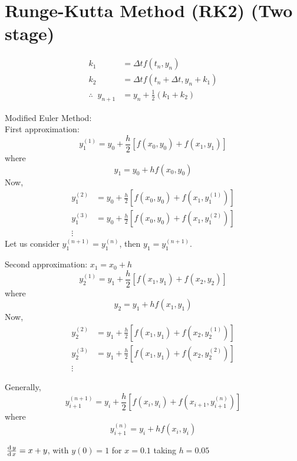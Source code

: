\documentclass[../main-sheet.tex]{subfiles}
\begin{document}
\section{Runge-Kutta Method (RK2) (Two stage)}
\begin{align*}
    k_1&=\Delta t f(t_n,y_n)\\
    k_2&=\Delta t f(t_n+\Delta t,y_n+k_1)\\
    \therefore\;\;y_{n+1}&=y_n+\frac{1}{2}(k_1+k_2)
\end{align*}
\begin{ex}
    Modified Euler Method:\\
    
    
    First approximation:
    \[
        y_1^{(1)}=y_0+\frac{h}{2}\left[ f(x_0,y_0)+f(x_1,y_{1})\right]
    \]
    where
    \[
        y_1=y_0+hf(x_0,y_0)
    \]
    Now,
    \begin{align*}
        y_1^{(2)}&=y_0+\frac{h}{2}\left[ f(x_0,y_0)+f(x_1,y_{1}^{(1)})\right]\\
        y_1^{(3)}&=y_0+\frac{h}{2}\left[ f(x_0,y_0)+f(x_1,y_{1}^{(2)})\right]\\
        \vdots &
    \end{align*}
    Let us consider \(y_1^{(n+1)}=y_1^{(n)}\), then \(y_1=y_1^{(n+1)}\).
    
    
    Second approximation: \(x_1=x_0+h\)
    \[
        y_2^{(1)}=y_1+\frac{h}{2}\left[ f(x_1,y_1)+f(x_2,y_{2})\right]
    \]
    where
    \[
        y_2=y_1+hf(x_1,y_1)
    \]
    Now,
    \begin{align*}
        y_2^{(2)}&=y_1+\frac{h}{2}\left[ f(x_1,y_1)+f(x_2,y_{2}^{(1)})\right]\\
        y_2^{(3)}&=y_1+\frac{h}{2}\left[ f(x_1,y_1)+f(x_2,y_{2}^{(2)})\right]\\
        \vdots &
    \end{align*}

    Generally,
    \[
        y_{i+1}^{(n+1)}=y_i+\frac{h}{2}\left[ f(x_i,y_i)+f(x_{i+1},y_{i+1}^{(n)})\right]
    \]
    where
    \[
        y_{i+1}^{(n)}=y_i+hf(x_i,y_i)
    \]
\end{ex}
\begin{prob}
    \(\,\frac{\mathrm{d}\,y}{\mathrm{d}\,x}=x+y\), with \(y(0)=1\) for \(x=0.1\) taking \(h=0.05\)
\end{prob}
\end{document}

